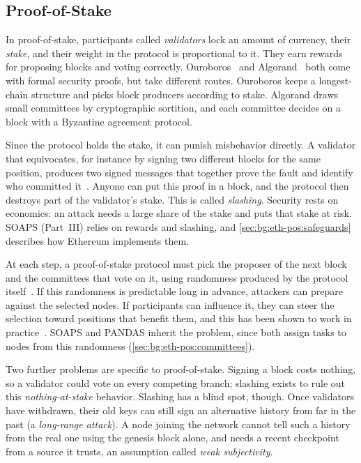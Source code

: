 \subsection{Proof-of-Stake}\label{sec:bg:consensus:pos}

In proof-of-stake, participants called \emph{validators} lock an amount of currency, their \emph{stake}, and their weight in the protocol is proportional to it.
They earn rewards for proposing blocks and voting correctly.
Ouroboros~\cite{kiayias2017ouroboros} and Algorand~\cite{gilad2017algorand} both come with formal security proofs, but take different routes.
Ouroboros keeps a longest-chain structure and picks block producers according to stake.
Algorand draws small committees by cryptographic sortition, and each committee decides on a block with a Byzantine agreement protocol.

Since the protocol holds the stake, it can punish misbehavior directly.
A validator that equivocates, for instance by signing two different blocks for the same position, produces two signed messages that together prove the fault and identify who committed it~\cite{sheng2021forensics}.
Anyone can put this proof in a block, and the protocol then destroys part of the validator's stake.
This is called \emph{slashing}.
Security rests on economics: an attack needs a large share of the stake and puts that stake at risk.
SOAPS (Part~III) relies on rewards and slashing, and \autoref{sec:bg:eth-pos:safeguards} describes how Ethereum implements them.

At each step, a proof-of-stake protocol must pick the proposer of the next block and the committees that vote on it, using randomness produced by the protocol itself~\cite{gilad2017algorand}.
If this randomness is predictable long in advance, attackers can prepare against the selected nodes.
If participants can influence it, they can steer the selection toward positions that benefit them, and this has been shown to work in practice~\cite{nagy2025forking}. 
SOAPS and PANDAS inherit the problem, since both assign tasks to nodes from this randomness (\autoref{sec:bg:eth-pos:committees}).

Two further problems are specific to proof-of-stake.
Signing a block costs nothing, so a validator could vote on every competing branch; slashing exists to rule out this \emph{nothing-at-stake} behavior.
Slashing has a blind spot, though.
Once validators have withdrawn, their old keys can still sign an alternative history from far in the past (a \emph{long-range attack}).
A node joining the network cannot tell such a history from the real one using the genesis block alone, and needs a recent checkpoint from a source it trusts, an assumption called \emph{weak subjectivity}.

